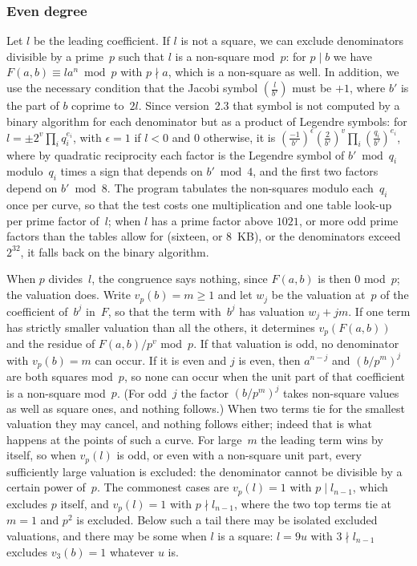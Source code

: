 \documentclass[12pt,a4paper,oneside]{amsart}
\begin{document}
\subsubsection{Even degree} \label{sec:elim}

Let $l$ be the leading coefficient. If $l$ is not a square, we can exclude
denominators divisible by a prime~$p$ such that $l$ is a non-square
mod~$p$: for $p \mid b$ we have $F(a,b) \equiv l a^n \bmod p$ with $p \nmid
a$, which is a non-square as well. In addition, we use the necessary
condition that the Jacobi symbol $\left(\frac{l}{b'}\right)$ must be $+1$,
where $b'$ is the part of $b$ coprime to~$2l$. Since version~2.3 that symbol
is not computed by a binary algorithm for each denominator but as a product
of Legendre symbols: for $l = \pm 2^v \prod_i q_i^{e_i}$, with $\epsilon = 1$
if $l < 0$ and $0$ otherwise, it is
$\left(\frac{-1}{b'}\right)^{\epsilon} \left(\frac{2}{b'}\right)^{v}
\prod_i \left(\frac{q_i}{b'}\right)^{e_i}$, where by quadratic reciprocity
each factor is the Legendre symbol of $b' \bmod q_i$ modulo~$q_i$ times a
sign that depends on $b' \bmod 4$, and the first two factors depend on $b'
\bmod 8$. The program tabulates the non-squares modulo each~$q_i$ once per
curve, so that the test costs one multiplication and one table look-up per
prime factor of~$l$; when $l$ has a prime factor above $1021$, or more odd
prime factors than the tables allow for (sixteen, or 8~KB), or the
denominators exceed $2^{32}$, it falls back on the binary algorithm.

When $p$ divides~$l$, the congruence says nothing, since $F(a,b)$ is then
$0$ mod~$p$; the valuation does. Write $v_p(b) = m \ge 1$ and let $w_j$ be
the valuation at~$p$ of the coefficient of~$b^j$ in~$F$, so that the term
with~$b^j$ has valuation $w_j + jm$. If one term has strictly smaller
valuation than all the others, it determines $v_p(F(a,b))$ and the residue
of $F(a,b)/p^{v}$ mod~$p$. If that valuation is odd, no denominator with
$v_p(b) = m$ can occur. If it is even and $j$ is even, then $a^{n-j}$ and
$(b/p^m)^j$ are both squares mod~$p$, so none can occur when the unit part
of that coefficient is a non-square mod~$p$. (For odd~$j$ the factor
$(b/p^m)^j$ takes non-square values as well as square ones, and nothing
follows.) When two terms tie for the smallest valuation they may cancel, and
nothing follows either; indeed that is what happens at the points of such a
curve. For large~$m$ the leading term wins by itself, so when $v_p(l)$ is
odd, or even with a non-square unit part, every sufficiently large valuation
is excluded: the denominator cannot be divisible by a certain power of~$p$.
The commonest cases are $v_p(l) = 1$ with $p \mid l_{n-1}$, which excludes
$p$ itself, and $v_p(l) = 1$ with $p \nmid l_{n-1}$, where the two top terms
tie at $m = 1$ and $p^2$ is excluded. Below such a tail there may be isolated
excluded valuations, and there may be some when $l$ is a square: $l = 9u$
with $3 \nmid l_{n-1}$ excludes $v_3(b) = 1$ whatever $u$ is.
\end{document}
